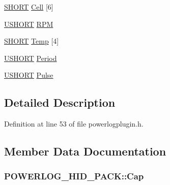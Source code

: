 \begin{DoxyCompactItemize}
\item 
\hyperlink{gcs_2src_2experimental_2_power_log6_s_2main_8cpp_a9909bd3cf05f0906045f2ee85be4eeac}{S\-H\-O\-R\-T} \hyperlink{struct_p_o_w_e_r_l_o_g___h_i_d___p_a_c_k_a13d6b3eadb4447aa5353664cf897a504}{Cell} \mbox{[}6\mbox{]}
\item 
\hyperlink{gcs_2src_2experimental_2_power_log6_s_2main_8cpp_a5850d5316caf7f4cedd742fdf8cd7c02}{U\-S\-H\-O\-R\-T} \hyperlink{struct_p_o_w_e_r_l_o_g___h_i_d___p_a_c_k_a037c72ffcf73e0ce8bcb6933441411bd}{R\-P\-M}
\item 
\hyperlink{gcs_2src_2experimental_2_power_log6_s_2main_8cpp_a9909bd3cf05f0906045f2ee85be4eeac}{S\-H\-O\-R\-T} \hyperlink{struct_p_o_w_e_r_l_o_g___h_i_d___p_a_c_k_a77fb2418138dbe5af859e51cbb4532eb}{Temp} \mbox{[}4\mbox{]}
\item 
\hyperlink{gcs_2src_2experimental_2_power_log6_s_2main_8cpp_a5850d5316caf7f4cedd742fdf8cd7c02}{U\-S\-H\-O\-R\-T} \hyperlink{struct_p_o_w_e_r_l_o_g___h_i_d___p_a_c_k_ad43cc2c3695fdd46953a602029e16fed}{Period}
\item 
\hyperlink{gcs_2src_2experimental_2_power_log6_s_2main_8cpp_a5850d5316caf7f4cedd742fdf8cd7c02}{U\-S\-H\-O\-R\-T} \hyperlink{struct_p_o_w_e_r_l_o_g___h_i_d___p_a_c_k_a761dee2316036998786b770e26d29736}{Pulse}
\end{DoxyCompactItemize}


\subsection{Detailed Description}


Definition at line 53 of file powerlogplugin.\-h.



\subsection{Member Data Documentation}
\hypertarget{struct_p_o_w_e_r_l_o_g___h_i_d___p_a_c_k_a17471b70ab588a58cfdbf608a04a3d53}{
\subsubsection[{Cap}]{ P\-O\-W\-E\-R\-L\-O\-G\-\_\-\-H\-I\-D\-\_\-\-P\-A\-C\-K\-::\-Cap}}\label{struct_p_o_w_e_r_l_o_g___h_i_d___p_a_c_k_a17471b70ab588a58cfdbf608a04a3d53}


